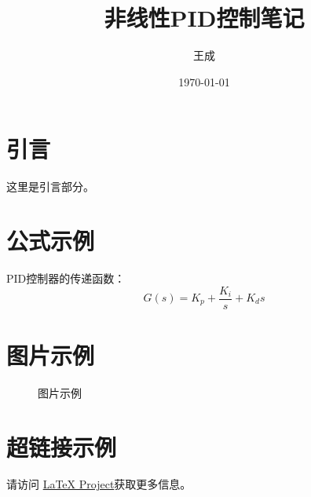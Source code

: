 \documentclass[12pt,a4paper]{article}
\title{非线性PID控制笔记}
\author{王成}
\date{\today}
\begin{document}
\maketitle

\section{引言}
这里是引言部分。

\section{公式示例}
PID控制器的传递函数：
\begin{equation}
G(s) = K_p + \frac{K_i}{s} + K_d s
\end{equation}

\section{图片示例}
\begin{figure}[htbp]
    \centering
    \caption{图片示例}
    \label{fig:example}
\end{figure}

\section{超链接示例}
请访问 \href{https://www.latex-project.org/}{LaTeX Project}获取更多信息。
\end{document}

